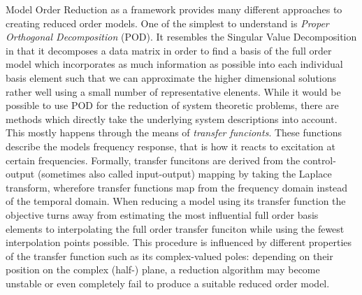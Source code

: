 Model Order Reduction as a framework provides many different approaches to creating reduced order models.
One of the simplest to understand is \emph{Proper Orthogonal Decomposition} (POD).
It resembles the Singular Value Decomposition in that it decomposes a data matrix in order to find a basis of the full order model which incorporates as much information as possible into each individual basis element such that we can approximate the higher dimensional solutions rather well using a small number of representative elenents.
While it would be possible to use POD for the reduction of system theoretic problems, there are methods which directly take the underlying system descriptions into account.
This mostly happens through the means of \emph{transfer funcionts}.
These functions describe the models frequency response, that is how it reacts to excitation at certain frequencies.
Formally, transfer funcitons are derived from the control-output (sometimes also called input-output) mapping by taking the Laplace transform, wherefore transfer functions map from the frequency domain instead of the temporal domain.
When reducing a model using its transfer function the objective turns away from estimating the most influential full order basis elements to interpolating the full order transfer funciton while using the fewest interpolation points possible.
This procedure is influenced by different properties of the transfer function such as its complex-valued poles: depending on their position on the complex (half-) plane, a reduction algorithm may become unstable or even completely fail to produce a suitable reduced order model.

